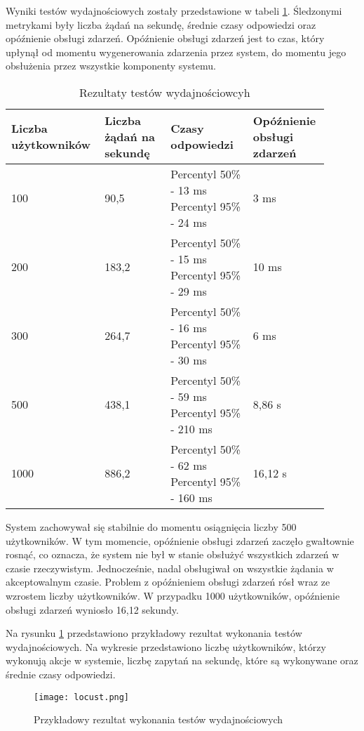 Wyniki testów wydajnościowych zostały przedstawione w tabeli \ref{table:performance}. Śledzonymi metrykami były liczba żądań na sekundę, średnie czasy odpowiedzi oraz opóźnienie obsługi zdarzeń. Opóźnienie obsługi zdarzeń jest to czas, który upłynął od momentu wygenerowania zdarzenia przez system, do momentu jego obsłużenia przez wszystkie komponenty systemu.

\begin{longtable}{| m{0.25\linewidth} | m{0.2\linewidth} | m{0.25\linewidth} | m{0.2\linewidth} |}
    \caption{Rezultaty testów wydajnościowcyh}
    \label{table:performance} \\

    \hline
    Liczba użytkowników & Liczba żądań na sekundę & Czasy odpowiedzi & Opóźnienie obsługi zdarzeń \\ \hline\hline \endfirsthead \endfoot
    \hline \endlastfoot

    100 & 90,5 & Percentyl 50\% - 13 ms \newline Percentyl 95\% - 24 ms & 3 ms \\ \hline
    200 & 183,2 & Percentyl 50\% - 15 ms \newline Percentyl 95\% - 29 ms & 10 ms \\ \hline
    300 & 264,7 & Percentyl 50\% - 16 ms \newline Percentyl 95\% - 30 ms & 6 ms \\ \hline
    500 & 438,1 & Percentyl 50\% - 59 ms \newline Percentyl 95\% - 210 ms & 8,86 s \\ \hline
    1000 & 886,2 & Percentyl 50\% - 62 ms \newline Percentyl 95\% - 160 ms & 16,12 s \\ \hline
\end{longtable}

System zachowywał się stabilnie do momentu osiągnięcia liczby 500 użytkowników. W tym momencie, opóźnienie obsługi zdarzeń zaczęło gwałtownie rosnąć, co oznacza, że system nie był w stanie obsłużyć wszystkich zdarzeń w czasie rzeczywistym. Jednocześnie, nadal obsługiwał on wszystkie żądania w akceptowalnym czasie. Problem z opóźnieniem obsługi zdarzeń rósł wraz ze wzrostem liczby użytkowników. W przypadku 1000 użytkowników, opóźnienie obsługi zdarzeń wyniosło 16,12 sekundy.


Na rysunku \ref{fig:locust} przedstawiono przykładowy rezultat wykonania testów wydajnościowych. Na wykresie przedstawiono liczbę użytkowników, którzy wykonują akcje w systemie, liczbę zapytań na sekundę, które są wykonywane oraz średnie czasy odpowiedzi.

\begin{figure}[!h]
    \centering \texttt{[image: locust.png]}
    \caption{Przykładowy rezultat wykonania testów wydajnościowych}
    \label{fig:locust}
\end{figure}